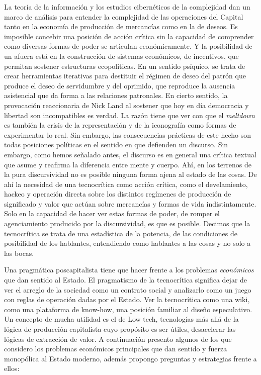 La teoría de la información y los estudios cibernéticos de la complejidad dan un marco de análisis para entender la complejidad de las operaciones del Capital tanto en la economía de producción de mercancías como en la de deseos. Es imposible concebir una posición de acción crítica sin la capacidad de comprender como diversas formas de poder se articulan económicamente. Y la posibilidad de un afuera está en la construcción de sistemas económicos, de incentivos, que permitan sostener estructuras ecopoliticas. En un sentido psíquico, se trata de crear herramientas iterativas para destituir el régimen de deseo del patrón que produce el deseo de servidumbre y del oprimido, que reproduce la ausencia asistencial que da forma a las relaciones patronales. En cierto sentido, la provocación reaccionaria de Nick Land al sostener que hoy en día democracia y libertad son incompatibles es verdad. La razón tiene que ver con que el \emph{meltdown} es también la crisis de la representación y de la iconografía como formas de experimentar lo real. Sin embargo, las consecuencias prácticas de este hecho son todas posiciones políticas en el sentido en que defienden un discurso. Sin embargo, como hemos señalado antes, el discurso es en general una crítica textual que asume y reafirma la diferencia entre mente y cuerpo. Ahí, en los terrenos de la pura discursividad no es posible ninguna forma ajena al estado de las cosas. De ahí la necesidad de una tecnocrítica como acción crítica, como el develamiento, hackeo y operación directa sobre los distintos regímenes de producción de significado y valor que actúan sobre mercancías y formas de vida indistintamente. Solo en la capacidad de hacer ver estas formas de poder, de romper el agenciamiento producido por la discursividad, es que es posible. Decimos que la tecnocrítica se trata de una estadística de la potencia, de las condiciones de posibilidad de los hablantes, entendiendo como hablantes a las cosas y no solo a las bocas.

Una pragmática poscapitalista tiene que hacer frente a los problemas \emph{económicos} que dan sentido al Estado. El pragmatismo de la tecnocrítica significa dejar de ver el arreglo de la sociedad como un contrato social y analizarlo como un juego con reglas de operación dadas por el Estado. Ver la tecnocrítica como una wiki, como una plataforma de know-how, una posición familiar al diseño especulativo. Un concepto de mucha utilidad es el de Low tech, tecnologías más allá de la lógica de producción capitalista cuyo propósito es ser útiles, desacelerar las lógicas de extracción de valor. A continuación presento algunos de los que considero los problemas económicos principales que dan sentido y fuerza monopólica al Estado moderno, además propongo preguntas y estrategias frente a ellos:

